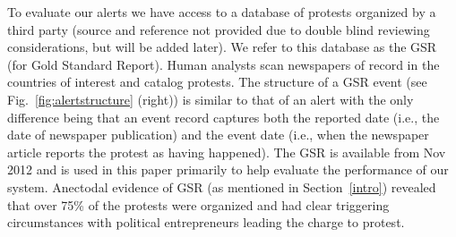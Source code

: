 To evaluate our alerts we have access to a database of protests organized by a third party (source and reference
not provided due to double blind reviewing considerations, but will be added later). We refer to this database as the
GSR (for Gold Standard Report). Human analysts scan newspapers of record in the countries of interest and catalog
protests. The structure of a GSR event (see Fig.~\ref{fig:alertstructure} (right)) is similar to that of an alert with
the only difference being that an event record captures both the reported date (i.e., the date of newspaper publication)
and the event date (i.e., when the newspaper article reports the protest as having happened).
The GSR is available from Nov 2012  and is used in this paper primarily to 
help evaluate the performance of our system. Anectodal evidence of GSR (as mentioned in Section~\ref{intro}) revealed
that over 75\% of the protests were organized and had clear triggering circumstances with political entrepreneurs leading the
charge to protest.



